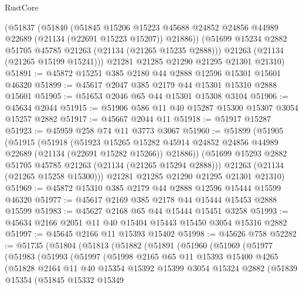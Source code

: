 \begin{lexlean}{RustCore}
\begin{coremodule}
      (@51837
        (@51840
          (@51845
            @15206
            @15223
            @45688
            @24852
            @24856
            @44989
            @22689
            (@21134 (@22691 @15223 @15207))
            @21886))
        (@51699 @15234 @2882 @51705 @45785 @21263 (@21134 (@21265 @15235 @2888)))
        @21263
        (@21134 (@21265 @15199 @15241)))
      @21281
      @21285
      @21290
      @21295
      @21301
      @21310)
@51891 := @45872 @15251 @385 @2180 @44 @2888 @12596 @15301 @15601 @46320
@51899 := @45617 @2047 @385 @2179 @44 @15301 @15310 @2888 @15601
@51905 := @51653 @2046 @65 @44 @15301 @15308 @3104
@51906 := @45634 @2044
@51915 := @51906 @586 @11 @40 @15287 @15300 @15307 @3054 @15257 @2882
@51917 := @45667 @2044 @11
@51918 := @51917 @15287
@51923 := @45959 @258 @74 @11 @3773 @3067
@51960 := @51899
    (@51905
      (@51915
        (@51918
          (@51923
            @15265
            @15282
            @45914
            @24852
            @24856
            @44989
            @22689
            (@21134 (@22691 @15282 @15266))
            @21886))
        (@51699 @15293 @2882 @51705 @45785 @21263 (@21134 (@21265 @15294 @2888)))
        @21263
        (@21134 (@21265 @15258 @15300)))
      @21281
      @21285
      @21290
      @21295
      @21301
      @21310)
@51969 := @45872 @15310 @385 @2179 @44 @2888 @12596 @15444 @15599 @46320
@51977 := @45617 @2169 @385 @2178 @44 @15444 @15453 @2888 @15599
@51983 := @45627 @2168 @65 @44 @15444 @15451 @3258
@51993 := @45634 @2166 @2051 @11 @40 @15404 @15443 @15450 @3054 @15316 @2882
@51997 := @45645 @2166 @11 @15393 @15402
@51998 := @45626 @758
@52282 := @51735
    (@51804
      (@51813
        (@51882
          (@51891
            (@51960
              (@51969
                (@51977
                  (@51983
                    (@51993
                      (@51997
                        (@51998
                          @2165
                          @65
                          @11
                          @15393
                          @15400
                          @4265
                          (@51828
                            @2164
                            @11
                            @40
                            @15354
                            @15392
                            @15399
                            @3054
                            @15324
                            @2882
                            (@51839
                              @15354
                              (@51845
                                @15332
                                @15349

\end{coremodule}
\end{lexlean}
